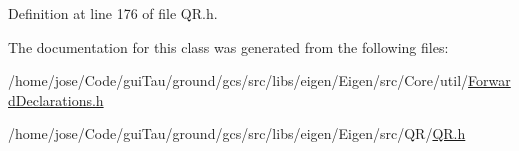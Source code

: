 Definition at line 176 of file Q\-R.\-h.



The documentation for this class was generated from the following files\-:\begin{DoxyCompactItemize}
\item 
/home/jose/\-Code/gui\-Tau/ground/gcs/src/libs/eigen/\-Eigen/src/\-Core/util/\hyperlink{_forward_declarations_8h}{Forward\-Declarations.\-h}\item 
/home/jose/\-Code/gui\-Tau/ground/gcs/src/libs/eigen/\-Eigen/src/\-Q\-R/\hyperlink{_q_r_8h}{Q\-R.\-h}\end{DoxyCompactItemize}
